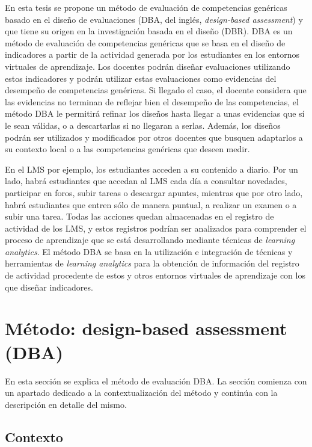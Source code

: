 En esta tesis se propone un método de evaluación de competencias genéricas basado en el diseño de evaluaciones (DBA, del inglés, \emph{design-based assessment}) y que tiene su origen en la investigación basada en el diseño (DBR). DBA es un método de evaluación de competencias genéricas que se basa en el diseño de indicadores a partir de la actividad generada por los estudiantes en los entornos virtuales de aprendizaje. Los docentes podrán diseñar evaluaciones utilizando estos indicadores y podrán utilizar estas evaluaciones como evidencias del desempeño de competencias genéricas. Si llegado el caso, el docente considera que las evidencias no terminan de reflejar bien el desempeño de las competencias, el método DBA le permitirá refinar los diseños hasta llegar a unas evidencias que sí le sean válidas, o a descartarlas si no llegaran a serlas. Además, los diseños podrán ser utilizados y modificados por otros docentes que busquen adaptarlos a su contexto local o a las competencias genéricas que deseen medir. 

En el LMS por ejemplo, los estudiantes acceden a su contenido a diario. Por un lado, habrá estudiantes que accedan al LMS cada día a consultar novedades, participar en foros, subir tareas o descargar apuntes, mientras que por otro lado, habrá estudiantes que entren sólo de manera puntual, a realizar un examen o a subir una tarea. Todas las acciones quedan almacenadas en el registro de actividad de los LMS, y estos registros podrían ser analizados para comprender el proceso de aprendizaje que se está desarrollando mediante técnicas de \emph{learning analytics}. El método DBA se basa en la utilización e integración de técnicas y herramientas de \emph{learning analytics} para la obtención de información del registro de actividad procedente de estos y otros entornos virtuales de aprendizaje con los que diseñar indicadores.


\section{Método: design-based assessment (DBA)} \label{cha:met-sec:dba}

En esta sección se explica el método de evaluación DBA. La sección comienza con un apartado dedicado a la contextualización del método y continúa con la descripción en detalle del mismo.

\subsection{Contexto}

